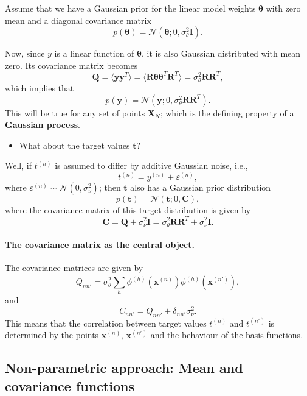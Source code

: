 \documentclass[%
oneside,                 %
final,                   %
10pt]{article}
\begin{document}
Assume that we have a Gaussian prior for the linear model weights $\boldsymbol{\theta}$ with zero mean and a diagonal covariance matrix
\[
p(\boldsymbol{\theta}) = \mathcal{N} \left( \boldsymbol{\theta}; 0, \sigma_\theta^2 \boldsymbol{I} \right).
\]

Now, since $y$ is a linear function of $\boldsymbol{\theta}$, it is also Gaussian distributed with mean zero. Its covariance matrix becomes
\[
\boldsymbol{Q} = \langle \boldsymbol{y} \boldsymbol{y}^T \rangle = \langle \boldsymbol{R} \boldsymbol{\theta} \boldsymbol{\theta}^T \boldsymbol{R}^T \rangle
= \sigma_\theta^2 \boldsymbol{R} \boldsymbol{R}^T,
\]
which implies that
\[
p(\boldsymbol{y}) = \mathcal{N} \left( \boldsymbol{y}; 0, \sigma_\theta^2 \boldsymbol{R} \boldsymbol{R}^T \right).
\]
This will be true for any set of points $\boldsymbol{X}_N$; which is the defining property of a \textbf{Gaussian process}.

\begin{itemize}
\item What about the target values $\boldsymbol{t}$?
\end{itemize}

\noindent
Well, if $t^{(n)}$ is assumed to differ by additive Gaussian noise, i.e., 
\[
t^{(n)} = y^{(n)} + \varepsilon^{(n)}, 
\]
where $\varepsilon^{(n)} \sim \mathcal{N} \left( 0, \sigma_\nu^2 \right)$; then $\boldsymbol{t}$ also has a Gaussian prior distribution
\[
p(\boldsymbol{t}) = \mathcal{N} \left( \boldsymbol{t}; 0, \boldsymbol{C} \right),
\]
where the covariance matrix of this target distribution is given by
\[
\boldsymbol{C} = \boldsymbol{Q} + \sigma_\nu^2 \boldsymbol{I} = \sigma_\theta^2 \boldsymbol{R} \boldsymbol{R}^T + \sigma_\nu^2 \boldsymbol{I}.
\]

\paragraph{The covariance matrix as the central object.}
The covariance matrices are given by
\[
Q_{nn'} = \sigma_\theta^2 \sum_h \phi^{(h)} \left( \boldsymbol{x}^{(n)} \right) \phi^{(h)} \left( \boldsymbol{x}^{(n')} \right),
\]
and
\[
C_{nn'} = Q_{nn'} + \delta_{nn'} \sigma_\nu^2.
\]
This means that the correlation between target values $t^{(n)}$ and $t^{(n')}$ is determined by the points $\boldsymbol{x}^{(n)}$, $\boldsymbol{x}^{(n')}$ and the behaviour of the basis functions.

\subsection{Non-parametric approach: Mean and covariance functions}
\end{document}
